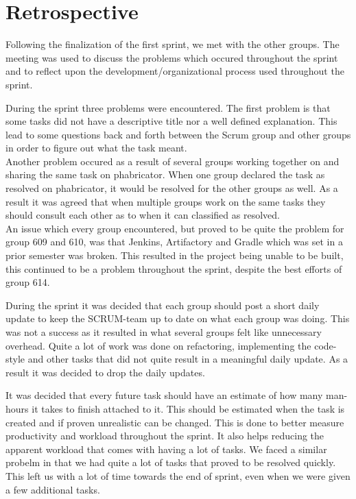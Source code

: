 \section{Retrospective}\label{S1Retro}
Following the finalization of the first sprint, we met with the other
groups. The meeting was used to discuss the problems which occured
throughout the sprint and to reflect upon the development/organizational
process used throughout the sprint.\nl

During the sprint three problems were encountered. The first problem is that
some tasks did not have a descriptive title nor a well defined explanation.
This lead to some questions back and forth between the Scrum group and other
groups in order to figure out what the task meant.\\
Another problem occured as a result of several groups working together on and
sharing the same task on phabricator. When one group declared the task as
resolved on phabricator, it would be resolved for the other groups as well. As
a result it was agreed that when multiple groups work on the same tasks they
should consult each other as to when it can classified as resolved.\\
An issue which every group encountered, but proved to be quite the problem for
group 609 and 610, was that Jenkins, Artifactory and Gradle which was set in a
prior semester was broken. This resulted in the project being unable to be
built, this continued to be a problem throughout the sprint, despite the best
efforts of group 614.\nl

During the sprint it was decided that each group should post a short daily
update to keep the SCRUM-team up to date on what each group was doing. This was
not a success as it resulted in what several groups felt like unnecessary
overhead. Quite a lot of work was done on refactoring, implementing the
code-style and other tasks that did not quite result in a meaningful daily
update. As a result it was decided to drop the daily updates.\nl

It was decided that every future task should have an estimate of how many
man-hours it takes to finish attached to it. This should be estimated when the
task is created and if proven unrealistic can be changed. This is done to
better measure productivity and workload throughout the sprint. It also helps
reducing the apparent workload that comes with having a lot of tasks. We faced a
similar probelm in that we had quite a lot of tasks that proved to be resolved
quickly. This left us with a lot of time towards the end of sprint, even when we
were given a few additional tasks.

